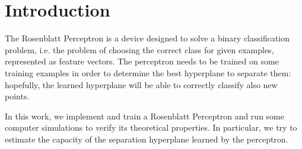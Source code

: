 \section{Introduction}
\label{sec:introduction}

The Rosenblatt Perceptron \cite{rosenblatt1958perceptron} is a device designed to solve a binary classification problem, i.e. the problem of choosing the correct class for given examples, represented as feature vectors.
The perceptron needs to be trained on some training examples in order to determine the best hyperplane to separate them:
hopefully, the learned hyperplane will be able to correctly classify also new points.

In this work, we implement and train a Rosenblatt Perceptron and run some computer simulations to verify its theoretical properties.
In particular, we try to estimate the capacity of the separation hyperplane learned by the perceptron.
